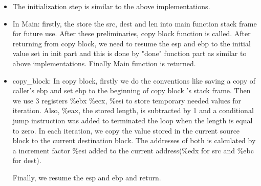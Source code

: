 \documentclass{article}
\begin{document}
\begin{itemize}
\begin{itemize}
\item The initialization step is similar to the above implementations.
\item In Main: firstly, the store the src, dest and len into main function stack frame for future use. After these preliminaries, copy block function is called. After returning from copy block, we need to resume the esp and ebp to the initial value set in init part and this is done by "done" function part as similar to above implementations. Finally Main function is returned.
\item copy\_block: In copy block, firstly we do the conventions like saving a copy of caller’s ebp and set ebp to the beginning of copy block ’s stack frame. Then we use 3 registers \%ebx \%ecx, \%esi to store temporary needed values for iteration. Also, \%eax, the stored length, is subtracted by 1 and a conditional jump instruction was added to terminated the loop when the length is equal to zero. In each iteration, we copy the value stored in the current source block to the current destination block. The addresses of both is calculated by a increment factor \%esi added to the current address(\%edx for src and \%ebc for dest).

Finally, we resume the esp and ebp and return.
\end{itemize}

\end{itemize}
\end{document}

